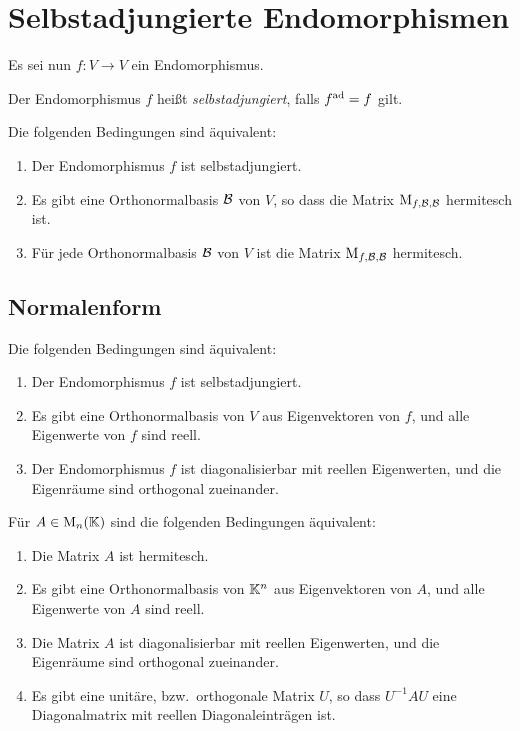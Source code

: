 \section{Selbstadjungierte Endomorphismen}

Es sei nun $f \colon V \to V$ ein Endomorphismus.

\begin{definition}
  Der Endomorphismus $f$ heißt \emph{selbstadjungiert}, falls $f^{\operatorname{ad}} = f$ gilt.
\end{definition}

\begin{lemma}
  Die folgenden Bedingungen sind äquivalent:
  \begin{enumerate}
    \item
      Der Endomorphismus $f$ ist selbstadjungiert.
    \item
      Es gibt eine Orthonormalbasis $\mathcal{B}$ von $V$, so dass die Matrix $\operatorname{M}_{f, \mathcal{B}, \mathcal{B}}$ hermitesch ist.
    \item
      Für jede Orthonormalbasis $\mathcal{B}$ von $V$ ist die Matrix $\operatorname{M}_{f, \mathcal{B}, \mathcal{B}}$ hermitesch.
  \end{enumerate}
\end{lemma}



\subsection{Normalenform}

\begin{theorem}
  Die folgenden Bedingungen sind äquivalent:
  \begin{enumerate}
    \item
      Der Endomorphismus $f$ ist selbstadjungiert.
    \item
      Es gibt eine Orthonormalbasis von $V$ aus Eigenvektoren von $f$, und alle Eigenwerte von $f$ sind reell.
    \item
      Der Endomorphismus $f$ ist diagonalisierbar mit reellen Eigenwerten, und die Eigenräume sind orthogonal zueinander.
  \end{enumerate}
\end{theorem}

\begin{corollary}
  \label{corollary: hermitian matrices are diagonalizable}
  Für $A \in \operatorname{M}_{n}(\mathbb{K})$ sind die folgenden Bedingungen äquivalent:
  \begin{enumerate}
    \item
      Die Matrix $A$ ist hermitesch.
    \item
      Es gibt eine Orthonormalbasis von $\mathbb{K}^n$ aus Eigenvektoren von $A$, und alle Eigenwerte von $A$ sind reell.
    \item
      Die Matrix $A$ ist diagonalisierbar mit reellen Eigenwerten, und die Eigenräume sind orthogonal zueinander.
    \item
      Es gibt eine unitäre, bzw.\ orthogonale Matrix $U$, so dass $U^{-1} A U$ eine Diagonalmatrix mit reellen Diagonaleinträgen ist.
  \end{enumerate}
\end{corollary}

